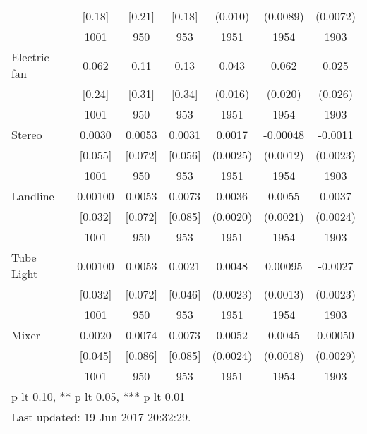 \begin{table}[htbp]
\begin{tabular*}{1\hsize}{@{\hskip\tabcolsep\extracolsep\fill}l*{1}{cccccc}}
                                &   [0.18]&   [0.21]&   [0.18]&  (0.010)         & (0.0089)         & (0.0072)         \\
                                &     1001&      950&      953&     1951         &     1954         &     1903         \\
Electric fan                    &    0.062&     0.11&     0.13&    0.043\sym{**} &    0.062\sym{***}&    0.025         \\
                                &   [0.24]&   [0.31]&   [0.34]&  (0.016)         &  (0.020)         &  (0.026)         \\
                                &     1001&      950&      953&     1951         &     1954         &     1903         \\
Stereo                          &   0.0030&   0.0053&   0.0031&   0.0017         & -0.00048         &  -0.0011         \\
                                &  [0.055]&  [0.072]&  [0.056]& (0.0025)         & (0.0012)         & (0.0023)         \\
                                &     1001&      950&      953&     1951         &     1954         &     1903         \\
Landline                        &  0.00100&   0.0053&   0.0073&   0.0036\sym{*}  &   0.0055\sym{**} &   0.0037         \\
                                &  [0.032]&  [0.072]&  [0.085]& (0.0020)         & (0.0021)         & (0.0024)         \\
                                &     1001&      950&      953&     1951         &     1954         &     1903         \\
Tube Light                      &  0.00100&   0.0053&   0.0021&   0.0048\sym{**} &  0.00095         &  -0.0027         \\
                                &  [0.032]&  [0.072]&  [0.046]& (0.0023)         & (0.0013)         & (0.0023)         \\
                                &     1001&      950&      953&     1951         &     1954         &     1903         \\
Mixer                           &   0.0020&   0.0074&   0.0073&   0.0052\sym{**} &   0.0045\sym{**} &  0.00050         \\
                                &  [0.045]&  [0.086]&  [0.085]& (0.0024)         & (0.0018)         & (0.0029)         \\
                                &     1001&      950&      953&     1951         &     1954         &     1903         \\
\bottomrule
\multicolumn{7}{l}{\footnotesize * p lt 0.10, ** p lt 0.05, *** p lt 0.01}\\
\multicolumn{7}{l}{\footnotesize Last updated: 19 Jun 2017 20:32:29.}\\
\end{tabular*}
\end{table}

